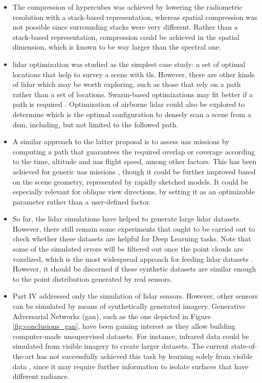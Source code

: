 \begin{itemize}
    \item The compression of hypercubes was achieved by lowering the radiometric resolution with a stack-based representation, whereas spatial compression was not possible since surrounding stacks were very different. Rather than a stack-based representation, compression could be achieved in the spatial dimension, which is known to be way larger than the spectral one. 
    \item \acrshort{lidar} optimization was studied as the simplest case study: a set of optimal locations that help to survey a scene with \acrshort{tls}. However, there are other kinds of \acrshort{lidar} which may be worth exploring, such as those that rely on a path rather than a set of locations. Swarm-based optimizations may fit better if a path is required \cite{roberge_fast_2018}. Optimization of airborne \acrshort{lidar} could also be explored to determine which is the optimal configuration to densely scan a scene from a \acrshort{dsm}, including, but not limited to the followed path.
    \item A similar approach to the latter proposal is to assess \acrshort{uas} missions by computing a path that guarantees the required overlap or coverage according to the time, altitude and \acrshort{uas} flight speed, among other factors. This has been achieved for generic \acrshort{uas} missions \cite{pessacg_simplifying_2022}, though it could be further improved based on the scene geometry, represented by rapidly sketched models. It could be especially relevant for oblique view directions, by setting it as an optimizable parameter rather than a user-defined factor. 
    \item So far, the \acrshort{lidar} simulations have helped to generate large \acrshort{lidar} datasets. However, there still remain some experiments that ought to be carried out to check whether these datasets are helpful for Deep Learning tasks. Note that some of the simulated errors will be filtered out once the point clouds are voxelized, which is the most widespread approach for feeding \acrshort{lidar} datasets \cite{hackel_semantic3d_2017, behley_towards_2021}. However, it should be discerned if these synthetic datasets are similar enough to the point distribution generated by real sensors. 
    \item Part IV addressed only the simulation of \acrshort{lidar} sensors. However, other sensors can be simulated by means of synthetically generated imagery. Generative Adversarial Networks (\acrshort{gan}), such as the one depicted in Figure \ref{fig:conclusions_gan}, have been gaining interest as they allow building computer-made unsupervised datasets. For instance, infrared data could be simulated from visible imagery to create larger datasets. The current state-of-the-art has not successfully achieved this task by learning solely from visible data \cite{li_multi-branch_2019, li_i-gans_2021, kniaz_thermalgan_2019, ozkanoglu_infragan_2022, yi_cycle_2023}, since it may require further information to isolate surfaces that have different radiance. 

\end{itemize}
